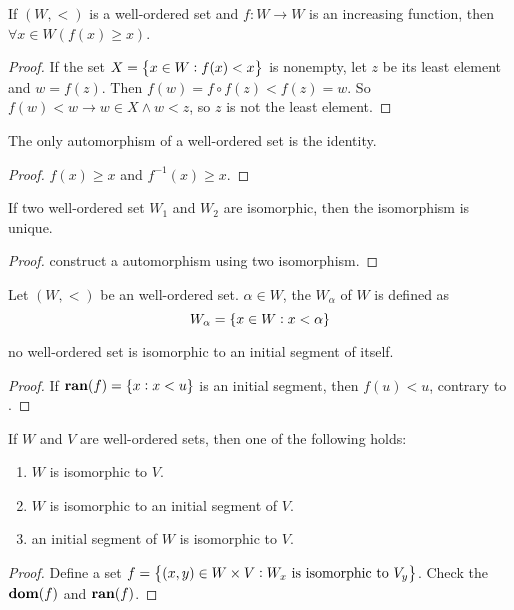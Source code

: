 \begin{theorem}\label{wellorderedsetisomorphismisbigger}
    If $(W,<)$ is a well-ordered set and $f:W \rightarrow W$ is an increasing function, then $\forall x\in W \left( f(x) \geq x \right)$.
\end{theorem}
\begin{proof}
    If the set $X = \set{x \in W: f(x) < x}$ is nonempty, let $z$ be its least element and $w = f(z)$. Then $f(w) = f \circ f(z) < f(z) = w $. So $f(w) < w \rightarrow w \in X \wedge w < z$, so $z$ is not the least element.
\end{proof}

\begin{theorem}
    The only automorphism of a well-ordered set is the identity.    
\end{theorem}
\begin{proof}
    $f(x) \geq x$ and $f^{-1} (x) \geq x$.
\end{proof}


\begin{theorem}
    If two well-ordered set $W_1$ and $W_2$ are isomorphic, then the isomorphism is unique.
\end{theorem}
\begin{proof}
    construct a automorphism using two isomorphism.
\end{proof}

\begin{definition}
    Let $(W,<)$ be an well-ordered set. $\alpha \in W$, the  $W_\alpha$ of $W$ is defined as
    \begin{equation}
        W_\alpha = \set{x \in W: x < \alpha}
    \end{equation}
\end{definition}

\begin{theorem}
    no well-ordered set is isomorphic to an initial segment of itself.    
\end{theorem}
\begin{proof}
    If $\mathbf{ran}(f) = \set{x: x < u}$ is an initial segment, then $f(u) < u$, contrary to .
\end{proof}

\begin{theorem}
    If $W$ and $V$ are well-ordered sets, then one of the following holds:
    \begin{enumerate}
        \item $W$ is isomorphic to $V$.
        \item $W$ is isomorphic to an initial segment of $V$.
        \item an initial segment of $W$ is isomorphic to $V$.
    \end{enumerate}    
\end{theorem}
\begin{proof}
    Define a set $f = \set{(x,y)\in W \times V: W_x \text{ is isomorphic to } V_y}$. Check the $\mathbf{dom}(f)$ and $\mathbf{ran}(f)$.
\end{proof}





